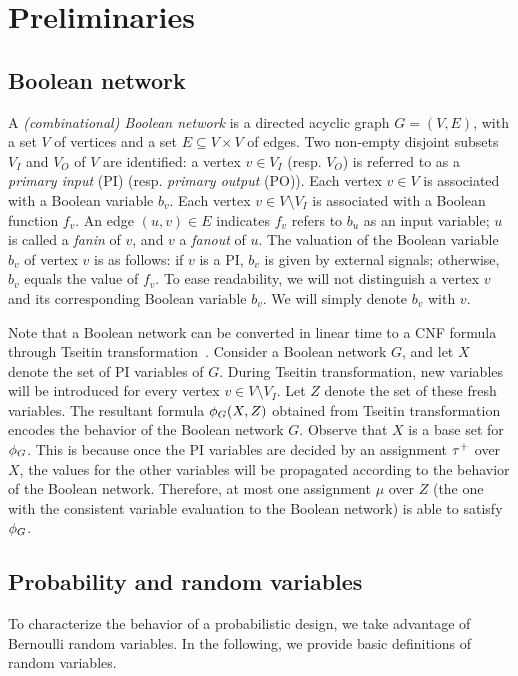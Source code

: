 \section{Preliminaries}
\label{sect:prob-preliminaries}

\subsection{Boolean network}
\label{sect:prob-preliminaries-boolean-network}

A \textit{(combinational) Boolean network} is a directed acyclic graph $G=(V,E)$,
with a set $V$ of vertices and a set $E\subseteq V \times V$ of edges.
Two non-empty disjoint subsets $V_I$ and $V_O$ of $V$ are identified:
a vertex $v \in V_I$ (resp. $V_O$) is referred to as a \textit{primary input} (PI) (resp. \textit{primary output} (PO)).
Each vertex $v \in V$ is associated with a Boolean variable $b_v$.
Each vertex $v \in V \setminus V_I$ is associated with a Boolean function $f_v$.
An edge $(u,v)\in E$ indicates $f_v$ refers to $b_u$ as an input variable;
$u$ is called a \textit{fanin} of $v$, and $v$ a \textit{fanout} of $u$.
The valuation of the Boolean variable $b_v$ of vertex $v$ is as follows:
if $v$ is a PI, $b_v$ is given by external signals; otherwise, $b_v$ equals the value of $f_v$.
To ease readability, we will not distinguish a vertex $v$ and its corresponding Boolean variable $b_v$.
We will simply denote $b_v$ with $v$.

Note that a Boolean network can be converted in linear time to a CNF formula through Tseitin transformation~\cite{Tseitin1983}.
Consider a Boolean network $G$,
and let $X$ denote the set of PI variables of $G$.
During Tseitin transformation,
new variables will be introduced for every vertex $v\in V\setminus V_I$.
Let $Z$ denote the set of these fresh variables.
The resultant formula $\phi_G(X,Z)$ obtained from Tseitin transformation encodes the behavior of the Boolean network $G$.
Observe that $X$ is a base set for $\phi_G$.
This is because once the PI variables are decided by an assignment $\tau^+$ over $X$,
the values for the other variables will be propagated according to the behavior of the Boolean network.
Therefore, at most one assignment $\mu$ over $Z$ (the one with the consistent variable evaluation to the Boolean network) is able to satisfy $\phi_G$.

\subsection{Probability and random variables}
\label{sect:prob-preliminaries-random-variable}
To characterize the behavior of a probabilistic design,
we take advantage of Bernoulli random variables.
In the following, we provide basic definitions of random variables.

